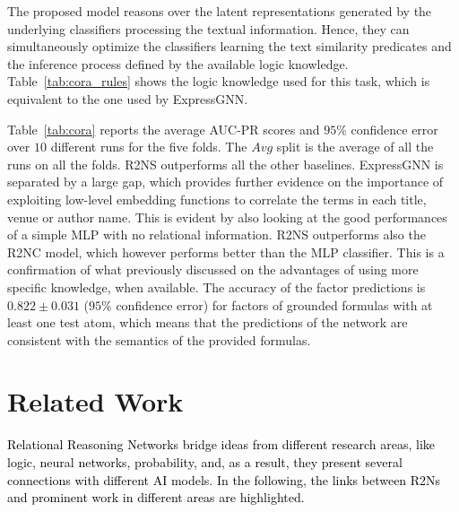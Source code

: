 \documentclass[journal]{IEEEtran}
\newcommand{\ar}[1]{\textcolor{black}{#1}}
\begin{document}
The proposed model reasons over the latent representations generated by the underlying classifiers processing the textual information. Hence, they can simultaneously optimize the classifiers learning the text similarity predicates and the inference process defined by the available logic knowledge.
Table~\ref{tab:cora_rules} shows the logic knowledge used for this task, which is equivalent to the one used by ExpressGNN.


Table~\ref{tab:cora} reports the average AUC-PR scores and $95\%$ confidence error over $10$ different runs for the five folds. The $Avg$ split is the average of all the runs on all the folds.
R2NS outperforms all the other baselines. ExpressGNN is separated by a large gap, which provides further evidence on the importance of exploiting low-level embedding functions to correlate the terms in each title, venue or author name. This is evident by also looking at the good performances of a simple MLP with no relational information. R2NS outperforms also the R2NC model, which however performs better than the MLP classifier.  This is a confirmation of what previously discussed on the advantages of using more specific knowledge, when available.
The accuracy of the factor predictions is $0.822 \pm 0.031$ ($95\%$ confidence error) for factors of grounded formulas with at least one test atom, which means that the predictions of the network are consistent with the semantics of the provided formulas.


\section{Related Work}
\label{sec:Relwork}

\ar{Relational Reasoning Networks bridge ideas from different research areas, like logic, neural networks, probability, and, as a result, they present several connections with different AI models. In the following, the links between R2Ns and prominent work in different areas are highlighted.}
\end{document}

